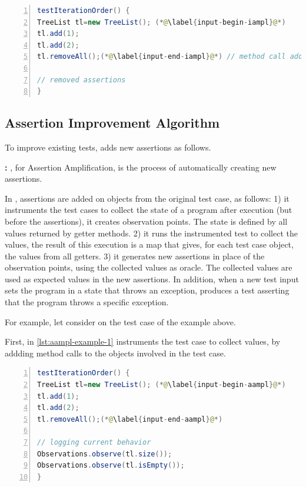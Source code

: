 \begin{lstlisting}[caption={An example of an \Iampl{}: the amplification added a method call to \emph{removeAll()} on \emph{tl}.},label=lst:iampl-example,float,language=java,numbers=left] 
testIterationOrder() {
TreeList tl=new TreeList(); (*@\label{input-begin-iampl}@*)
tl.add(1);
tl.add(2);
tl.removeAll();(*@\label{input-end-iampl}@*) // method call added

// removed assertions
}
\end{lstlisting}

\subsection{Assertion Improvement Algorithm}
\label{subsec:new-assertions}

To improve existing tests, \dspot adds new assertions as follows.

\textbf{\Aampl:} \Aampl, for Assertion Amplification, is the process of automatically creating new assertions.

In \dspot, assertions are added on objects from the original test case, as follows: 
1) it instruments the  test cases to collect the state of a program after execution (but before the assertions), \ie it creates observation points. The state is defined by all values returned by getter methods.
2) it runs the instrumented test to collect the values,
the result of this execution is a map that gives, for each test case object, the values from all getters.
3) it generates new assertions in place of the observation points, using the collected values as oracle. The collected values are used as expected values in the new assertions.
In addition, when a new test input sets the program in a state that throws an exception,  \dspot produces a test asserting that the program throws a specific exception.

For example, let consider \Aampl{} on the test case of the example above. 

First, in \autoref{lst:aampl-example-1} \dspot instruments the test case to collect values, by addding method calls to the objects involved in the test case.

\begin{lstlisting}[caption={In \Aampl{}, the second step is to instrument and run the test to collect runtime values.},label=lst:aampl-example-1,float,language=java,numbers=left] 
testIterationOrder() {
TreeList tl=new TreeList(); (*@\label{input-begin-aampl}@*)
tl.add(1);
tl.add(2);
tl.removeAll();(*@\label{input-end-aampl}@*)

// logging current behavior
Observations.observe(tl.size()); 
Observations.observe(tl.isEmpty()); 
}
\end{lstlisting}


